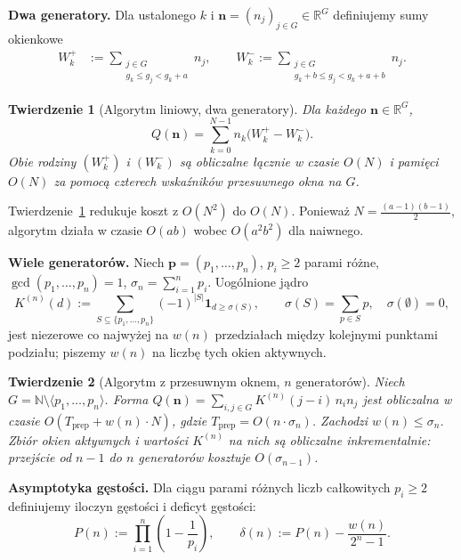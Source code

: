 \documentclass[11pt,a4paper]{amsart}
\theoremstyle{plain}
\newtheorem{theorem}{Twierdzenie}[section]
\theoremstyle{definition}
\theoremstyle{remark}
\begin{document}
\textbf{Dwa generatory.}
Dla ustalonego $k$ i $\mathbf{n} = (n_j)_{j \in G} \in \mathbb{R}^G$
definiujemy sumy okienkowe
\begin{align*}
  W^+_k &:= \sum_{\substack{j \in G \\ g_k \leq g_j < g_k + a}} n_j, \qquad
  W^-_k := \sum_{\substack{j \in G \\ g_k + b \leq g_j < g_k + a + b}} n_j.
\end{align*}

\begin{theorem}[Algorytm liniowy, dwa generatory]
\label{thm:linear}
Dla każdego $\mathbf{n} \in \mathbb{R}^G$,
\[
  Q(\mathbf{n}) = \sum_{k=0}^{N-1} n_k \bigl(W^+_k - W^-_k\bigr).
\]
Obie rodziny $(W^+_k)$ i $(W^-_k)$ są obliczalne łącznie
w czasie $O(N)$ i pamięci $O(N)$ za pomocą czterech
wskaźników przesuwnego okna na $G$.
\end{theorem}

Twierdzenie~\ref{thm:linear} redukuje koszt z $O(N^2)$ do $O(N)$.
Ponieważ $N = \tfrac{(a-1)(b-1)}{2}$, algorytm działa w czasie
$O(ab)$ wobec $O(a^2 b^2)$ dla naiwnego.

\textbf{Wiele generatorów.}
Niech $\mathbf{p} = (p_1, \ldots, p_n)$, $p_i \geq 2$ parami różne,
$\gcd(p_1,\ldots,p_n) = 1$, $\sigma_n = \sum_{i=1}^n p_i$.
Uogólnione jądro
\[
  K^{(n)}(d) := \sum_{S \subseteq \{p_1,\ldots,p_n\}} (-1)^{|S|}
               \mathbf{1}_{d \geq \sigma(S)}, \qquad
  \sigma(S) = \sum_{p \in S} p, \quad \sigma(\emptyset) = 0,
\]
jest niezerowe co najwyżej na $w(n)$ przedziałach między kolejnymi
punktami podziału; piszemy $w(n)$ na liczbę tych okien aktywnych.

\begin{theorem}[Algorytm z przesuwnym oknem, $n$ generatorów]
\label{thm:general}
Niech $G = \mathbb{N} \setminus \langle p_1,\ldots,p_n \rangle$.
Forma $Q(\mathbf{n}) = \sum_{i,j \in G} K^{(n)}(j-i)\,n_i n_j$
jest obliczalna w czasie $O(T_{\mathrm{prep}} + w(n) \cdot N)$, gdzie
$T_{\mathrm{prep}} = O(n \cdot \sigma_n)$.
Zachodzi $w(n) \leq \sigma_n$.
Zbiór okien aktywnych i wartości $K^{(n)}$ na nich są obliczalne
inkrementalnie: przejście od $n-1$ do $n$ generatorów kosztuje
$O(\sigma_{n-1})$.
\end{theorem}

\textbf{Asymptotyka gęstości.}
Dla ciągu parami różnych liczb całkowitych $p_i \geq 2$
definiujemy iloczyn gęstości i deficyt gęstości:
\[
  P(n) := \prod_{i=1}^{n} \!\left(1 - \frac{1}{p_i}\right), \qquad
  \delta(n) := P(n) - \frac{w(n)}{2^n - 1}.
\]
\end{document}
